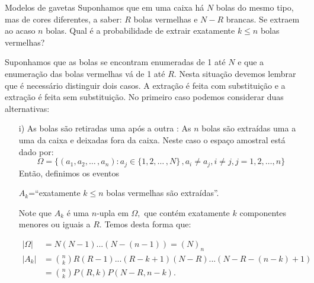 \begin{frame}
\begin{block}{Modelos de gavetas}
Suponhamos que em uma caixa há $N$ bolas do mesmo tipo, mas de cores diferentes, a saber: $R$ bolas
vermelhas e $N-R$ brancas. Se extraem ao  acaso $n$ bolas. Qual é  a probabilidade de extrair exatamente $k \leq n$ bolas vermelhas?

Suponhamos que as bolas se encontram  enumeradas de 1 até $N$ e que a enumeração das bolas vermelhas vá de 1 até $R$. Nesta situação devemos lembrar que é necessário distinguir dois casos. A extração é feita com substituição  e a  extração é feita sem substituição. No primeiro caso podemos considerar duas alternativas: 

\begin{enumerate}
\item[i)] As bolas são retiradas uma após a outra : As $n$ bolas são extraídas uma a uma da caixa e deixadas fora da caixa. Neste caso o espaço 
amostral está dado por:
$$\Omega= \{ (a_1, a_2, \dots \, , a_n): a_j \in \{1,2,\dots \, , N \} \, , a_i \not= a_j, i \not= j, j=1,2, \dots , n \}$$  
Então, definimos os eventos 
\begin{center}
$A_k$=``exatamente $k \leq n$ bolas vermelhas são extraídas''.
\end{center}
Note que $A_k$ é uma $n$-upla em $\Omega ,$ que contém exatamente $k$ componentes menores ou iguais a $R$. Temos desta forma que: 

\begin{equation*}\displaystyle
\begin{aligned}
\left| \Omega \right| &=  N(N-1)...(N-(n-1))=(N)_n \\
\left| A_k \right| &= \binom{n}{k} R(R-1) ... (R-k+1)(N-R)...(N-R-(n-k)+1) \\
&=\binom{n}{k}P(R,k) P(N-R, n-k). \\
\end{aligned}
\end{equation*}

\end{enumerate}

 \end{block}
\end{frame}

